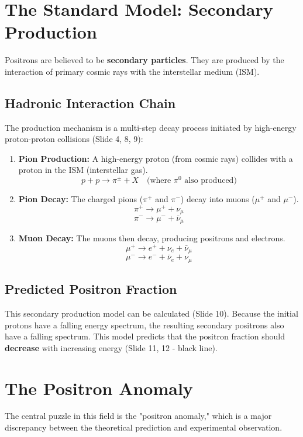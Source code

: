 \documentclass{sciposter}
\begin{document}
\begin{multicols}{3}
\section{The Standard Model: Secondary Production}
Positrons are believed to be \textbf{secondary particles}. They are produced by the interaction of primary cosmic rays with the interstellar medium (ISM).

\subsection{Hadronic Interaction Chain}
The production mechanism is a multi-step decay process initiated by high-energy proton-proton collisions (Slide 4, 8, 9):
\begin{enumerate}
    \item \textbf{Pion Production:} A high-energy proton (from cosmic rays) collides with a proton in the ISM (interstellar gas).
    $$ p + p \rightarrow \pi^{\pm} + X \quad (\text{where } \pi^0 \text{ also produced)} $$
    
    \item \textbf{Pion Decay:} The charged pions ($\pi^+$ and $\pi^-$) decay into muons ($\mu^+$ and $\mu^-$).
    $$ \pi^+ \rightarrow \mu^+ + \nu_{\mu} $$
    $$ \pi^- \rightarrow \mu^- + \bar{\nu}_{\mu} $$
    
    \item \textbf{Muon Decay:} The muons then decay, producing positrons and electrons.
    $$ \mu^+ \rightarrow e^+ + \nu_e + \bar{\nu}_{\mu} $$
    $$ \mu^- \rightarrow e^- + \bar{\nu}_e + \nu_{\mu} $$
\end{enumerate}

\subsection{Predicted Positron Fraction}
This secondary production model can be calculated (Slide 10). Because the initial protons have a falling energy spectrum, the resulting secondary positrons also have a falling spectrum. This model predicts that the positron fraction should \textbf{decrease} with increasing energy (Slide 11, 12 - black line).

\section{The Positron Anomaly}
The central puzzle in this field is the "positron anomaly," which is a major discrepancy between the theoretical prediction and experimental observation.


\end{multicols}
\end{document}
